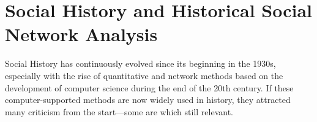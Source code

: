 \section{Social History and Historical Social Network Analysis}


Social History has continuously evolved since its beginning in the 1930s, especially with the rise of quantitative and network methods based on the development of computer science during the end of the 20th century.
If these computer-supported methods are now widely used in history\cite{kerschbaumerPowerNetworksProspects2015, petzCombiningNetworkResearch2022}, they attracted many criticism from the start---some are which still relevant.



